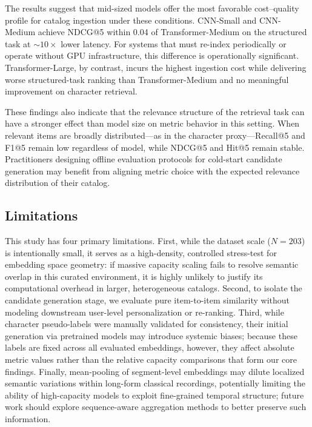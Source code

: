 \documentclass[sigconf]{acmart}
\begin{document}
The results suggest that mid-sized models offer the most favorable cost--quality profile for catalog ingestion under these conditions. CNN-Small and CNN-Medium achieve NDCG@5 within 0.04 of Transformer-Medium on the structured task at ${\sim}10{\times}$ lower latency. For systems that must re-index periodically or operate without GPU infrastructure, this difference is operationally significant. Transformer-Large, by contrast, incurs the highest ingestion cost while delivering worse structured-task ranking than Transformer-Medium and no meaningful improvement on character retrieval.

These findings also indicate that the relevance structure of the retrieval task can have a stronger effect than model size on metric behavior in this setting. When relevant items are broadly distributed---as in the character proxy---Recall@5 and F1@5 remain low regardless of model, while NDCG@5 and Hit@5 remain stable. Practitioners designing offline evaluation protocols for cold-start candidate generation may benefit from aligning metric choice with the expected relevance distribution of their catalog.

\subsection{Limitations}

This study has four primary limitations. First, while the dataset scale ($N{=}203$) is intentionally small, it serves as a high-density, controlled stress-test for embedding space geometry: if massive capacity scaling fails to resolve semantic overlap in this curated environment, it is highly unlikely to justify its computational overhead in larger, heterogeneous catalogs. Second, to isolate the candidate generation stage, we evaluate pure item-to-item similarity without modeling downstream user-level personalization or re-ranking. Third, while character pseudo-labels were manually validated for consistency, their initial generation via pretrained models may introduce systemic biases; because these labels are fixed across all evaluated embeddings, however, they affect absolute metric values rather than the relative capacity comparisons that form our core findings. Finally, mean-pooling of segment-level embeddings may dilute localized semantic variations within long-form classical recordings, potentially limiting the ability of high-capacity models to exploit fine-grained temporal structure; future work should explore sequence-aware aggregation methods to better preserve such information.
\end{document}

